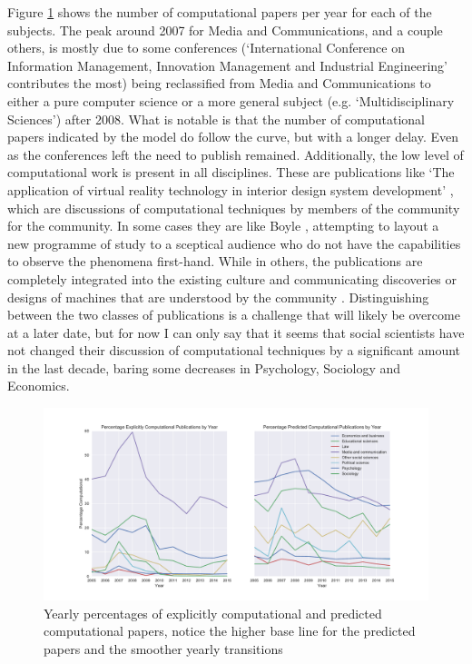 \documentclass[12pt, a4paper]{article}
\begin{document}
Figure \ref{temporal} shows the number of computational papers per year for each of the subjects. The peak around 2007 for Media and Communications, and a couple others, is mostly due to some conferences (`International Conference on Information Management, Innovation Management and Industrial Engineering' contributes the most) being reclassified from Media and Communications to either a pure computer science or a more general subject (e.g. `Multidisciplinary Sciences') after 2008. What is notable is that the number of computational papers indicated by the model do follow the curve, but with a longer delay. Even as the conferences left the need to publish remained. Additionally, the low level of computational work is present in all disciplines. These are publications like `The application of virtual reality technology in interior design system development' \citep{chuanrong2016application}, which are discussions of computational techniques by members of the community for the community. In some cases they are like Boyle \citep{shapin1985leviathan}, attempting to layout a new programme of study to a sceptical audience who do not have the capabilities to observe the phenomena first-hand. While in others, the publications are completely integrated into the existing culture and communicating discoveries or designs of machines that are understood by the community \citep{cetina2009epistemic}. Distinguishing between the two classes of publications is a challenge that will likely be overcome at a later date, but for now I can only say that it seems that social scientists have not changed their discussion of computational  techniques by a significant amount in the last decade, baring some decreases in Psychology, Sociology and Economics.

\begin{figure}[H]
	\centering
	\begin{adjustbox}{center}
		\includegraphics[width=1.2\textwidth]{temporal}
	\end{adjustbox}
	\caption{Yearly percentages of explicitly computational and predicted computational papers, notice the higher base line for the predicted papers and the smoother yearly transitions }\label{temporal}
\end{figure}
\end{document}
